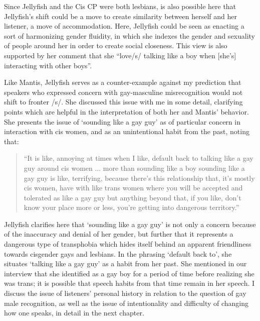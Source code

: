 \documentclass[12pt,twoside]{reedthesis}
\begin{document}
Since Jellyfish and the Cis CP were both lesbians, is also possible here that Jellyfish's shift could be a move to create similarity between herself and her listener, a move of accommodation. Here, Jellyfish could be seen as enacting a sort of harmonizing gender fluidity, in which she indexes the gender and sexuality of people around her in order to create social closeness. This view is also supported by her comment that she ``love/s/ talking like a boy when [she's] interacting with other boys''.

Like Mantis, Jellyfish serves as a counter-example against my prediction that speakers who expressed concern with gay-masculine misrecognition would not shift to fronter /s/. She discussed this issue with me in some detail, clarifying points which are helpful in the interpretation of both her and Mantis' behavior. She presents the issue of `sounding like a gay guy' as of particular concern in interaction with cis women, and as an unintentional habit from the past, noting that:
\begin{quote}
 ``It is like, annoying at times when I like, default back to talking like a gay guy around cis women ... more than sounding like a boy sounding like a gay guy is like, terrifying, because there's this relationship that, it's mostly cis women, have with like trans women where you will be accepted and tolerated as like a gay guy but anything beyond that, if you like, don't know your place more or less, you're getting into dangerous territory.''
\end{quote}
Jellyfish clarifies here that `sounding like a gay guy' is not only a concern because of the inaccuracy and denial of her gender, but further that it represents a dangerous type of transphobia which hides itself behind an apparent friendliness towards cisgender gays and lesbians. In the phrasing `default back to', she situates `talking like a gay guy' as a habit from her past. She mentioned in our interview that she identified as a gay boy for a period of time before realizing she was trans; it is possible that speech habits from that time remain in her speech. I discuss the issue of listeners' personal history in relation to the question of gay male recognition, as well as the issue of intentionality and difficulty of changing how one speaks, in detail in the next chapter.

\end{document}

